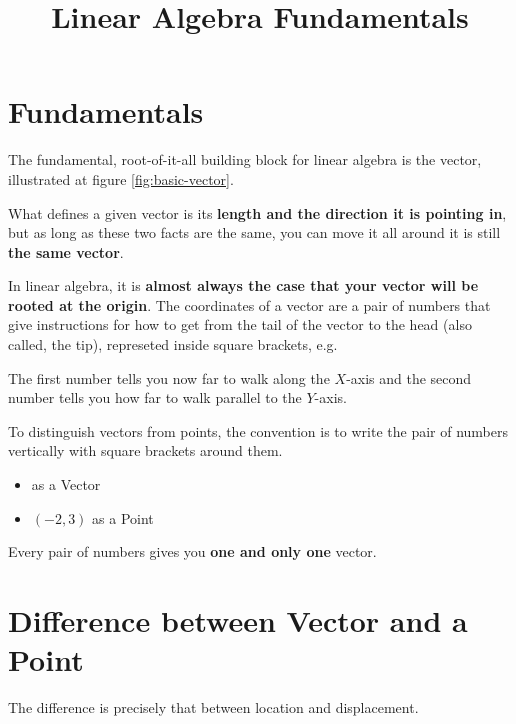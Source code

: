 \documentclass{article}
\title{Linear Algebra Fundamentals}
\date{}
\begin{document}
    \maketitle

    \tableofcontents


\section{Fundamentals}

The fundamental, root-of-it-all building block for linear algebra is the vector, illustrated at figure \ref{fig:basic-vector}.


What defines a given vector is its \textbf{length and the direction it is pointing in}, but as long as these two facts are the same, you can move it all around it is still \textbf{the same vector}.


In linear algebra, it is \textbf{almost always the case that your vector will be rooted at the origin}. The coordinates of a vector are a pair of numbers that give instructions for how to get from the tail of the vector to the head (also called, the tip), represeted inside square brackets, e.g. 

The first number tells you now far to walk along the \(X\)-axis and the second number tells you how far to walk parallel to the \(Y\)-axis.

To distinguish vectors from points, the convention is to write the pair of numbers vertically with square brackets around them.

\begin{itemize}
    \item {} as a Vector
    \item \( (-2, 3) \) as a Point
\end{itemize}

Every pair of numbers gives you \textbf{one and only one} vector.


\section{Difference between Vector and a Point}

The difference is precisely that between location and displacement.
\end{document}
